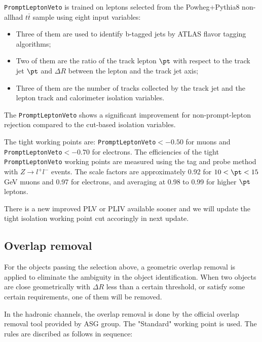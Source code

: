 \texttt{PromptLeptonVeto} is trained on leptons selected from the Powheg+Pythia8 non-allhad $t\bar t$ sample using eight input variables:
\begin{itemize}
\item Three of them are used to identify b-tagged jets by ATLAS flavor tagging algorithms;
\item Two of them are the ratio of the track lepton $\pt$ with respect to the track jet $\pt$ and $\Delta R$ between the lepton and the track jet axis;
\item Three of them are the number of tracks collected by the track jet and the lepton track and calorimeter isolation variables. 
\end{itemize}

The \texttt{PromptLeptonVeto} shows a significant improvement for non-prompt-lepton rejection compared to the cut-based isolation variables.

The tight working points are: \texttt{PromptLeptonVeto}$<-0.50$ for muons and \texttt{PromptLeptonVeto}$<-0.70$ for electrons.  The efficiencies of the tight \texttt{PromptLeptonVeto} working points are measured using the tag and probe method with $Z\rightarrow l^+l^-$ events. The scale factors are approximately 0.92 for $10<\pt<15$ GeV muons and 0.97 for electrons, and 
averaging at 0.98 to 0.99 for higher $\pt$ leptons.

There is a new improved PLV or PLIV available sooner and we will update the tight isolation working point cut accoringly in next update.

\subsection{Overlap removal}
For the objects passing the selection above, a geometric overlap removal is applied to eliminate the ambiguity in the object identification.  When two objects are close geometrically with $\Delta R$ less than a certain threshold, or satisfy some certain requirements, one of them will be removed. 

In the hadronic channels, the overlap removal is done by the official overlap removal tool provided by ASG group. The "Standard" working point is used. The rules are discribed as follows in sequence:

